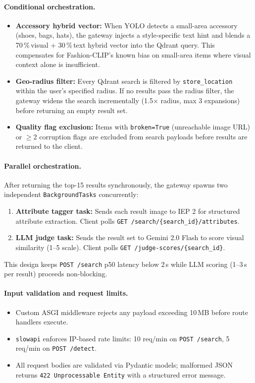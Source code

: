 \documentclass[12pt]{article}
\begin{document}
\paragraph{Conditional orchestration.}
\begin{itemize}[leftmargin=*]
    \item \textbf{Accessory hybrid vector:} When YOLO detects a small-area accessory (shoes, bags, hats), the gateway injects a style-specific text hint and blends a 70\,\%\,visual + 30\,\%\,text hybrid vector into the Qdrant query. This compensates for Fashion-CLIP's known bias on small-area items where visual context alone is insufficient.
    \item \textbf{Geo-radius filter:} Every Qdrant search is filtered by \texttt{store\_location} within the user's specified radius. If no results pass the radius filter, the gateway widens the search incrementally (1.5$\times$ radius, max 3 expansions) before returning an empty result set.
    \item \textbf{Quality flag exclusion:} Items with \texttt{broken=True} (unreachable image URL) or $\ge$2 corruption flags are excluded from search payloads before results are returned to the client.
\end{itemize}

\paragraph{Parallel orchestration.}
After returning the top-15 results synchronously, the gateway spawns two independent \texttt{BackgroundTasks} concurrently:
\begin{enumerate}[leftmargin=*]
    \item \textbf{Attribute tagger task:} Sends each result image to IEP 2 for structured attribute extraction. Client polls \texttt{GET /search/\{search\_id\}/attributes}.
    \item \textbf{LLM judge task:} Sends the result set to Gemini 2.0 Flash to score visual similarity (1--5 scale). Client polls \texttt{GET /judge-scores/\{search\_id\}}.
\end{enumerate}
This design keeps \texttt{POST /search} p50 latency below 2\,s while LLM scoring (1--3\,s per result) proceeds non-blocking.

\paragraph{Input validation and request limits.}
\begin{itemize}[leftmargin=*]
    \item Custom ASGI middleware rejects any payload exceeding 10\,MB before route handlers execute.
    \item \texttt{slowapi} enforces IP-based rate limits: 10 req/min on \texttt{POST /search}, 5 req/min on \texttt{POST /detect}.
    \item All request bodies are validated via Pydantic models; malformed JSON returns \texttt{422 Unprocessable Entity} with a structured error message.
\end{itemize}
\end{document}
